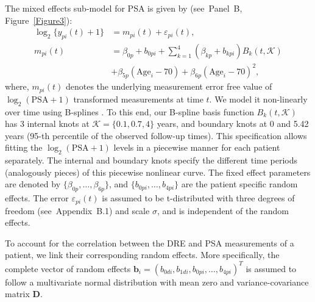 \documentclass[a4paper, 12pt]{article}
\begin{document}
The mixed effects sub-model for PSA is given by (see~Panel~B, Figure~\ref{Figure3}):
\begin{equation}
\label{eq:long_model_psa}
\begin{split}
    \log_2 \big\{y_{pi}(t) + 1\big\} &= m_{pi}(t) + \varepsilon_{pi}(t),\\
    m_{pi}(t) &= \beta_{0p} + b_{0pi} + \sum_{k=1}^4 (\beta_{kp} + b_{kpi})  B_k(t,\mathcal{K})\\ 
    &+ \beta_{5p} (\mbox{Age}_i-70) + \beta_{6p} (\mbox{Age}_i-70)^2,
    \end{split}
\end{equation}
where, $m_{pi}(t)$ denotes the underlying measurement error free value of $\log_2 (\mbox{PSA} + 1)$ transformed \citep{pearson1994mixed,lin2000latent} measurements at time $t$. We model it non-linearly over time using B-splines \citep{de1978practical}. To this end, our B-spline basis function $B_k(t, \mathcal{K})$ has 3 internal knots at $\mathcal{K} = \{0.1, 0.7, 4\}$ years, and boundary knots at 0 and 5.42 years (95-th percentile of the observed follow-up times). This specification allows fitting the $\log_2 (\mbox{PSA} + 1)$ levels in a piecewise manner for each patient separately. The internal and boundary knots specify the different time periods (analogously pieces) of this piecewise nonlinear curve. The fixed effect parameters are denoted by ${\{\beta_{0p},\ldots,\beta_{6p}\}}$, and ${\{b_{0pi}, \ldots, b_{4pi}\}}$ are the patient specific random effects. The error $\varepsilon_{pi}(t)$ is assumed to be t-distributed with three degrees of freedom (see~Appendix~B.1) and scale $\sigma$, and is independent of the random effects. 

To account for the correlation between the DRE and PSA measurements of a patient, we link their corresponding random effects. More specifically, the complete vector of random effects ${\boldsymbol{b}_i = (b_{0di}, b_{1di}, b_{0pi}, \ldots, b_{4pi})^T}$ is assumed to follow a multivariate normal distribution with mean zero and variance-covariance matrix $\boldsymbol{D}$.
\end{document}

